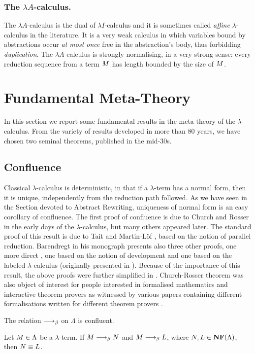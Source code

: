 \subsubsection{The $\lambda A$-calculus.}
The $\lambda A$-calculus is the dual of $\lambda I$-calculus and it is
sometimes called \emph{affine} $\lambda$-calculus in the
literature. It is a very weak calculus in which variables bound by
abstractions occur \emph{at most once} free in the abstraction's body,
thus forbidding \emph{duplication}. The $\lambda A$-calculus is strongly
normalising, in a very strong sense: every reduction sequence from a term
$M$ has length bounded by the size of $M$.
\section{Fundamental Meta-Theory}
In this section we report some fundamental results in the meta-theory of the $\lambda$-calculus. From the variety of results developed in more than 80 years, we have chosen two seminal theorems, published in the mid-30s.
\subsection{Confluence}
Classical $\lambda$-calculus is deterministic, in that if a $\lambda$-term has a normal form, then it is unique, independently from the reduction path followed. As we have seen in the Section devoted to Abstract Rewriting, uniqueness of normal form is an easy corollary of confluence. The first proof of confluence is due to Church and Rosser \cite{} in the early days of the $\lambda$-calculus, but many others appeared later. The standard proof of this result is due to Tait and Martin-Löf \cite[Section~3.2]{barendregt_lambda_1984}, based on the notion of parallel reduction. Barendregt in his monograph presents also three other proofs, one more direct \cite[Section~11.1]{barendregt_lambda_1984}, one based on the notion of development \cite[Section~11.2]{barendregt_lambda_1984} and one based on the labeled $\lambda$-calculus \cite[Section~14.2]{barendregt_lambda_1984} (originally presented in \cite{}). Because of the importance of this result, the above proofs were further simplified in \cite{}. Church-Rosser theorem was also object of interest for people interested in formalised mathematics and interactive theorem provers as witnessed by various papers containing different formalisations written for different theorem provers \cite{}.
\begin{theorem}
	The relation $\longrightarrow_\beta$ on $\Lambda$ is confluent.
\end{theorem}
\begin{corollary}
	Let $M\in\Lambda$ be a $\lambda$-term. If $M\longrightarrow_\beta N$ and $M\longrightarrow_\beta L$, where $N,L\in\textbf{NF}(\Lambda)$, then $N\equiv L$.
\end{corollary}
